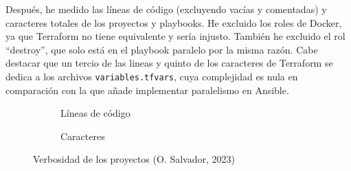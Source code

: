 \documentclass[11pt]{article}
\begin{document}
\begin{flushleft}
Después, he medido las líneas de código (excluyendo vacías y comentadas) y caracteres totales de los proyectos y playbooks. He excluido los roles de Docker, ya que Terraform no tiene equivalente y sería injusto. También he excluido el rol ``destroy'', que solo está en el playbook paralelo por la misma razón. Cabe destacar que un tercio de las lineas y quinto de los caracteres de Terraform se dedica a los archivos \texttt{variables.tfvars}, cuya complejidad es nula en comparación con la que añade implementar paralelismo en Ansible.
\linebreak

    \begin{figure}[htb]
        \centering
        \begin{subfigure}{0.48\textwidth}
            \caption{Líneas de código}
        \end{subfigure}
        \begin{subfigure}{0.45\textwidth}
            \caption{Caracteres}
        \end{subfigure}
        \caption{Verbosidad de los proyectos (O. Salvador, 2023)}
    \end{figure} 



\end{flushleft}
\end{document}
